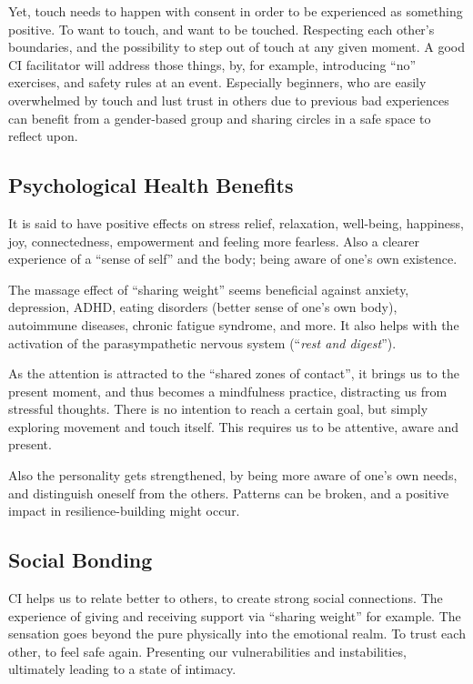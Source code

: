 Yet, touch needs to happen with consent in order to be experienced as something positive.
To want to touch, and want to be touched.
Respecting each other's boundaries, and the possibility to step out of touch at any given moment.
A good CI facilitator will address those things, by, for example, introducing ``no'' exercises, and safety rules at an event.
Especially beginners, who are easily overwhelmed by touch and lust trust in others due to previous bad experiences can benefit from a gender-based group and sharing circles in a safe space to reflect upon.

\subsection{Psychological Health Benefits}\label{subsec:psychological-health-benefits}

It is said to have positive effects on stress relief, relaxation, well-being, happiness, joy, connectedness, empowerment and feeling more fearless.
Also a clearer experience of a ``sense of self'' and the body; being aware of one's own existence.

The massage effect of ``sharing weight'' seems beneficial against anxiety, depression, ADHD, eating disorders (better sense of one's own body), autoimmune diseases, chronic fatigue syndrome, and more.
It also helps with the activation of the parasympathetic nervous system (``\textit{rest and digest}'').

As the attention is attracted to the ``shared zones of contact'', it brings us to the present moment, and thus becomes a mindfulness practice, distracting us from stressful thoughts.
There is no intention to reach a certain goal, but simply exploring movement and touch itself.
This requires us to be attentive, aware and present.

Also the personality gets strengthened, by being more aware of one's own needs, and distinguish oneself from the others.
Patterns can be broken, and a positive impact in resilience-building might occur.

\subsection{Social Bonding}\label{subsec:social-bonding}

CI helps us to relate better to others, to create strong social connections.
The experience of giving and receiving support via ``sharing weight'' for example.
The sensation goes beyond the pure physically into the emotional realm.
To trust each other, to feel safe again.
Presenting our vulnerabilities and instabilities, ultimately leading to a state of intimacy.

